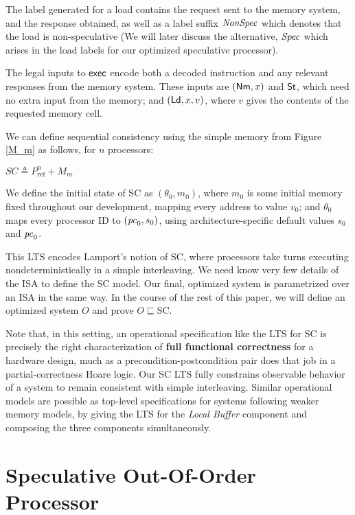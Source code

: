 The label generated for a load contains the request sent to the
memory system, and the response obtained, as well as a label suffix $\mathit{NonSpec}$
which denotes that the load is non-speculative (We will later discuss the
alternative, $\mathit{Spec}$ which arises in the load labels for our optimized
speculative processor).

The legal inputs to $\mathsf{exec}$ encode both a decoded instruction and any relevant
responses from the memory system.  These inputs are $(\mathsf{Nm}, x)$ and $\mathsf{St}$, which
need no extra input from the memory; and $(\mathsf{Ld}, x, v)$, where $v$ gives the
contents of the requested memory cell.

We can define sequential consistency using the simple memory from Figure
\ref{M_m} as follows, for $n$ processors:
\begin{defn}
$SC \triangleq P^n_\text{ref} + M_m$
\label{sc}
\end{defn}

We define the initial state of SC as $(\theta_0, m_0)$, where $m_0$ is
some initial memory fixed throughout our development, mapping every
address to value $v_0$; and $\theta_0$ maps every processor ID to
$(\mathit{pc}_0, s_0)$, using architecture-specific default values $s_0$ and
$\mathit{pc}_0$.

This LTS encodes Lamport's notion of SC, where processors take turns executing
nondeterministically in a simple interleaving.  We need know very few details
of the ISA to define the SC model.  Our final, optimized system is parametrized
over an ISA in the same way.  In the course of the rest of this paper, we will
define an optimized system $O$ and prove $O \sqsubseteq \text{SC}$.

Note that, in this setting, an operational specification like the LTS
for SC is precisely the right characterization of \textbf{full functional
  correctness} for a hardware design, much as a
precondition-postcondition pair does that job in a partial-correctness
Hoare logic.  Our SC LTS fully constrains observable behavior of a
system to remain consistent with simple interleaving.  Similar
operational models are possible as top-level specifications for
systems following weaker memory models, by giving the LTS for the \emph{Local
Buffer} component and composing the three components simultaneously.


\section{Speculative Out-Of-Order Processor}\label{sec:ooo}

